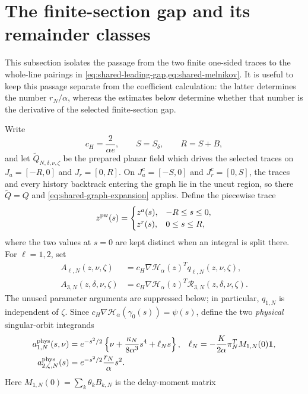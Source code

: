 \section{The finite-section gap and its remainder classes}
\label{subsec:finite-gap-bridge}

This subsection isolates the passage from the two finite one-sided traces to
the whole-line pairings in
\cref{eq:shared-leading-gap,eq:shared-melnikov}.  It is useful to keep this
passage separate from the coefficient calculation: the latter determines the
number \(r_N/\alpha\), whereas the estimates below determine whether that
number is the derivative of the selected finite-section gap.

Write
\[
 c_H=\frac{2}{\alpha e},\qquad S=S_\delta,
 \qquad R=S+B,
\]
and let \(\widetilde Q_{N,\delta,\nu,\zeta}\) be the prepared planar field
which drives the selected traces on
\(J_a=[-R,0]\) and \(J_r=[0,R]\).  On
\(J_a^c=[-S,0]\) and \(J_r^c=[0,S]\), the traces and every history
backtrack entering the graph lie in the uncut region, so there
\(\widetilde Q=Q\) and
\cref{eq:shared-graph-expansion} applies.  Define the piecewise trace
\[
 z^{\rm pw}(s)=
 \begin{cases}
  z^a(s),&-R\le s\le0,\\
  z^r(s),&0\le s\le R,
 \end{cases}
\]
where the two values at \(s=0\) are kept distinct when an integral is split
there.  For \(\ell=1,2\), set
\begin{align*}
 A_{\ell,N}(z,\nu,\zeta)
 &=c_H\nabla\mathscr H_\alpha(z)^T
       q_{\ell,N}(z,\nu,\zeta),\\
 A_{3,N}(z,\delta,\nu,\zeta)
 &=c_H\nabla\mathscr H_\alpha(z)^T
       \mathcal R_{3,N}(z,\delta,\nu,\zeta).
\end{align*}
The unused parameter arguments are suppressed below; in particular,
\(q_{1,N}\) is independent of \(\zeta\).  Since
\(c_H\nabla\mathscr H_\alpha(\gamma_0(s))=\psi(s)\), define the two
\emph{physical} singular-orbit integrands
\begin{align}
 a^{\rm phys}_{1,N}(s,\nu)
 &=e^{-s^2/2}\left\{
      \nu+\frac{\kappa_N}{8\alpha^3}s^4+\ell_Ns\right\},
 &\ell_N&=-\frac{K}{2\alpha}\pi_N^TM_{1,N}(0)\mathbf1,
                                                        \label{eq:gap-physical-a1}\\
 a^{\rm phys}_{2,\zeta,N}(s)
 &=e^{-s^2/2}\frac{r_N}{\alpha}s^2.                 \label{eq:gap-physical-a2z}
\end{align}
Here \(M_{1,N}(0)=\sum_k\theta_kB_{k,N}\) is the delay-moment matrix
